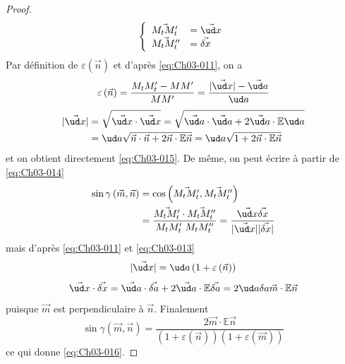 \begin{proof}
    \begin{displaymath}
        \left\{
        \begin{array}{ll}
            \vec{M_t M_t'} &= \vec{\ud x} \\
            \vec{M_t M_t''} &= \vec{\delta x}
        \end{array}
        \right.
    \end{displaymath}
    Par définition de $\varepsilon \left( \vec{n} \right)$ et d'après \eqref{eq:Ch03-011}, on a
    \begin{displaymath}
        \varepsilon \left( \vec{n} \right) = \frac{M_t M_t' - MM'}{MM'} = \frac{|\vec{\ud x}| - \vec{\ud a}}{\ud a}
    \end{displaymath}
    \begin{eqnarray*}
        |\vec{\ud x}| &= \sqrt{\vec{\ud x} \cdot \vec{\ud x}} = \sqrt{\vec{\ud a}\cdot\vec{\ud a} + 2 \vec{\ud a}\cdot \mathbb{E} \ud a} \\
        &= \ud a \sqrt{\vec{n}\cdot\vec{n} + 2\vec{n}\cdot\mathbb{E}\vec{n}} = \ud a \sqrt{1 + 2 \vec{n}\cdot \mathbb{E} \vec{n}}
    \end{eqnarray*}
    et on obtient directement \eqref{eq:Ch03-015}.
    De même, on peut écrire à partir de \eqref{eq:Ch03-014}
    \begin{eqnarray*}
        \sin \gamma \left( \vec{m},\vec{n} \right) &= \cos \left( \vec{M_tM_t'}, \vec{M_tM_t''} \right) \\
        &= \frac{\vec{M_tM_t'}\cdot \vec{M_tM_t''}}{M_t M_t'\ M_t M_t''} = \frac{\vec{\ud x}\vec{\delta x}}{|\vec{\ud x}||\vec{\delta x}|}
    \end{eqnarray*}
    mais d'après \eqref{eq:Ch03-011} et \eqref{eq:Ch03-013}
    \begin{displaymath}
        |\vec{\ud x}| = \ud a \left( 1 + \varepsilon \left( \vec{n} \right) \right)
    \end{displaymath}
    \begin{displaymath}
        \vec{\ud x} \cdot \vec{\delta x} = \vec{\ud a} \cdot \vec{\delta a} + 2 \vec{\ud a}\cdot \mathbb{E} \vec{\delta a} = 2 \ud a \delta a \vec{m} \cdot \mathbb{E} \vec{n}
    \end{displaymath} 
    puisque $\vec{m}$ est perpendiculaire à $\vec{n}$.
    Finalement
    \begin{displaymath}
        \sin \gamma \left( \vec{m}, \vec{n} \right) = \frac{2\vec{m}\cdot \mathbb{E} \vec{n}}{\left( 1 + \varepsilon \left( \vec{n} \right) \right)\left( 1 + \varepsilon \left( \vec{m} \right) \right)}
    \end{displaymath}
    ce qui donne \eqref{eq:Ch03-016}.
\end{proof}

